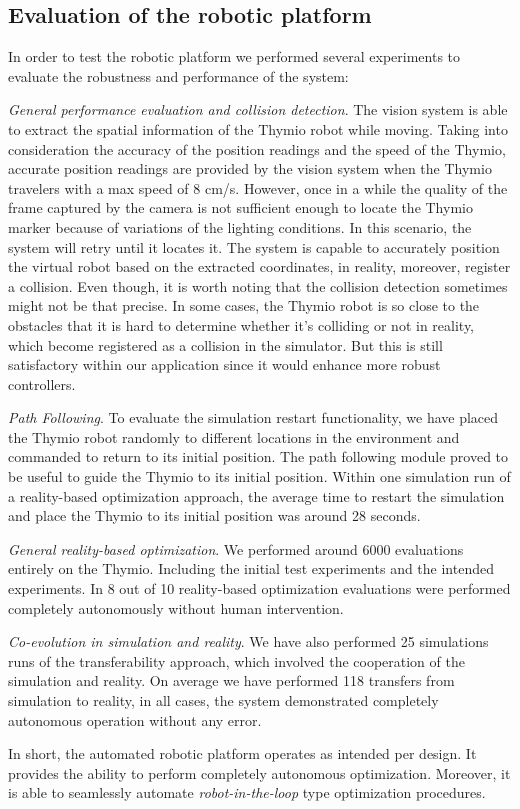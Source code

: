 \subsection{Evaluation of the robotic platform}

In order to test the robotic platform we performed several experiments to evaluate the robustness and performance of the system:

\emph{General performance evaluation and collision detection}. The vision system is able to extract the spatial information of the Thymio robot while moving. Taking into consideration the accuracy of the position readings and the speed of the Thymio, accurate position readings are provided by the vision system when the Thymio travelers with a max speed of 8 cm/s. However, once in a while the quality of the frame captured by the camera is not sufficient enough to locate the Thymio marker because of variations of the lighting conditions. In this scenario, the system will retry until it locates it. The system is capable to accurately position the virtual robot based on the extracted coordinates, in reality, moreover, register a collision. Even though, it is worth noting that the collision detection sometimes might not be that precise. In some cases, the Thymio robot is so close to the obstacles that it is hard to determine whether it's colliding or not in reality, which become registered as a collision in the simulator. But this is still satisfactory within our application since it would enhance more robust controllers.

\emph{Path Following}. To evaluate the simulation restart functionality, we have placed the Thymio robot randomly to different locations in the environment and commanded to return to its initial position. The path following module proved to be useful to guide the Thymio to its initial position. Within one simulation run of a reality-based optimization approach, the average time to restart the simulation and place the Thymio to its initial position was around 28 seconds.

\emph{General reality-based optimization}. We performed around 6000 evaluations entirely on the Thymio. Including the initial test experiments and the intended experiments. In 8 out of 10 reality-based optimization evaluations were performed completely autonomously without human intervention.

\emph{Co-evolution in simulation and reality}. We have also performed 25 simulations runs of the transferability approach, which involved the cooperation of the simulation and reality. On average we have performed 118 transfers from simulation to reality, in all cases, the system demonstrated completely autonomous operation without any error.

In short, the automated robotic platform operates as intended per design. It provides the ability to perform completely autonomous optimization. Moreover, it is able to seamlessly automate \emph{robot-in-the-loop} type optimization procedures.
